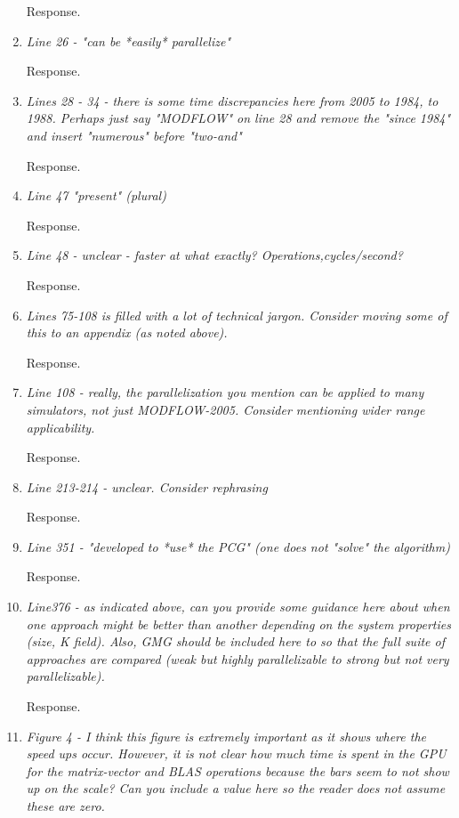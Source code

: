 \documentclass[12pt]{article} %
\begin{document}
\begin{enumerate}
Response. 

\item \textit{Line 26 - "can be *easily* parallelize"} 

Response. 

\item \textit{Lines 28 - 34 - there is some time discrepancies here from 2005 to 1984, to 1988. Perhaps just say "MODFLOW" on line 28 and remove the "since 1984" and insert "numerous" before "two-and" } 

Response.

\item \textit{Line 47 "present" (plural)} 

Response. 

\item \textit{Line 48 - unclear - faster at what exactly? Operations,cycles/second? } 

Response.

\item \textit{Lines 75-108 is filled with a lot of technical jargon. Consider moving some of this to an appendix (as noted above). } 

Response.

\item \textit{Line 108 - really, the parallelization you mention can be applied to many simulators, not just MODFLOW-2005. Consider mentioning wider range applicability. } 

Response.

\item \textit{Line 213-214 - unclear. Consider rephrasing } 

Response.

\item \textit{Line 351 - "developed to *use* the PCG" (one does not "solve" the algorithm) } 

Response.

\item \textit{Line376 - as indicated above, can you provide some guidance here about when one approach might be better than another depending on the system properties (size, K field). Also, GMG should be included here to so that the full suite of approaches are compared (weak but highly parallelizable to strong but not very parallelizable). } 

Response.

\item \textit{Figure 4 - I think this figure is extremely important as it shows where the speed ups occur. However, it is not clear how much time is spent in the GPU for the matrix-vector and BLAS operations because the bars seem to not show up on the scale? Can you include a value here so the reader does not assume these are zero. } 


\end{enumerate}
\end{document}
